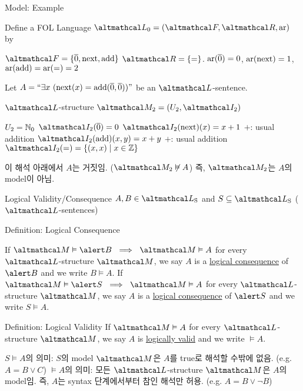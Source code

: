 \documentclass[../231120_msquare_computational-logic.tex]{subfiles}
\begin{document}
\begin{frame}{Model: Example}
    \begin{block}{}
        Define a FOL Language \(\Lang_0 = (\mcal F, \mcal R, \mrm{ar})\) by
        \begin{itemize}
            \ii \(\mcal F = \{\ol 0, \mrm{next}, \mrm{add}\}\)
            \ii \(\mcal R = \{=\}\).
            \ii \(\mathrm{ar}(\overline 0) = 0\), \(\mathrm{ar}(\mathrm{next}) = 1\),
                \(\mathrm{ar}(\mathrm{add}) = \mathrm{ar}(=) = 2\)
        \end{itemize}
        Let \(A = ``\exists x\ (\mathrm{next}(x) = \mathrm{add}(\overline 0, \overline 0))"\) be an \(\Lang\)-sentence.
    \end{block}
    \begin{exampleblock}{\(\Lang\)-structure \(\mcal M_2 = (U_2, \mcal I_2)\)}
        \begin{itemize}
            \ii \(U_2 = \mathbb{N}_0\)
            \ii \(\mcal I_2(\ol 0) = 0\)
            \ii \(\mcal I_2(\mrm{next})(x) = x + 1\) \hfill{\small \(+\): usual addition}
            \ii \(\mcal I_2(\mrm{add})(x, y) = x + y\) \hfill{\small \(+\): usual addition}
            \ii \(\mcal I_2(=) = \{(x,x) \mid x \in \ZZ\}\)
        \end{itemize}
        이 해석 아래에서 \(A\)는 거짓임. (\(\mcal M_2 \not\vDash A\))
        즉, \(\mcal M_2\)는 \(A\)의 model이 아님.
    \end{exampleblock}
\end{frame}

\begin{frame}{Logical Validity/Consequence}
    \(A, B \in \LS\) and \(S \subseteq \LS\) (\(\Lang\)-sentences)
    \begin{block}{Definition: Logical Consequence}
        \begin{itemize}
            \ii If \(\mcal M \vDash \alert B \ \implies\ \mcal M \vDash A\) for every \(\Lang\)-structure \(\mcal M\),
                we say \(A\) is a \ul{logical consequence} of \(\alert B\)
                and we write \(B \vDash A\).
            \ii If \(\mcal M \vDash \alert S \ \implies\ \mcal M \vDash A\) for every \(\Lang\)-structure \(\mcal M\),
                we say \(A\) is a \ul{logical consequence} of \(\alert S\)
                and we write \(S \vDash A\).
        \end{itemize}
    \end{block}
    \begin{block}{Definition: Logical Validity}
        If \(\mcal M \vDash A\) for every \(\Lang\)-structure \(\mcal M\),
        we say \(A\) is \ul{logically valid} and we write \(\vDash A\).
    \end{block}
    \pause
    \begin{itemize}
        \ii \(S \vDash A\)의 의미: \(S\)의 model \(\mcal M\)은 \(A\)를 true로
            해석할 수밖에 없음. (e.g. \(A = B \lor C\))
        \ii \(\vDash A\)의 의미: 모든 \(\Lang\)-structure \(\mcal M\)은 \(A\)의 model임.
            즉, \(A\)는 syntax 단계에서부터 참인 해석만 허용.
            (e.g. \(A = B \lor \lnot B\))
    \end{itemize}
\end{frame}
\end{document}
